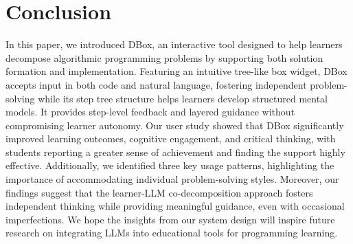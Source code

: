 \section{Conclusion}


In this paper, we introduced DBox, an interactive tool designed to help learners decompose algorithmic programming problems by supporting both solution formation and implementation. Featuring an intuitive tree-like box widget, DBox accepts input in both code and natural language, fostering independent problem-solving while its step tree structure helps learners develop structured mental models. It provides step-level feedback and layered guidance without compromising learner autonomy.
Our user study showed that DBox significantly improved learning outcomes, cognitive engagement, and critical thinking, with students reporting a greater sense of achievement and finding the support highly effective. Additionally, we identified three key usage patterns, highlighting the importance of accommodating individual problem-solving styles. Moreover, our findings suggest that the learner-LLM co-decomposition approach fosters independent thinking while providing meaningful guidance, even with occasional imperfections.
We hope the insights from our system design will inspire future research on integrating LLMs into educational tools for programming learning.